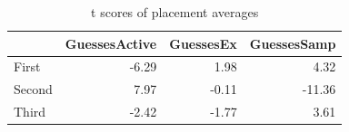 
\begin{table}
\begin{tabular}{lrrr}
\toprule
{} &  GuessesActive &  GuessesEx &  GuessesSamp \\
\midrule
First  &      -6.29 &       1.98 &         4.32 \\
Second &       7.97 &      -0.11 &       -11.36 \\
Third  &      -2.42 &      -1.77 &         3.61 \\
\bottomrule
\end{tabular}
\caption{t scores of placement averages}
\end{table}
